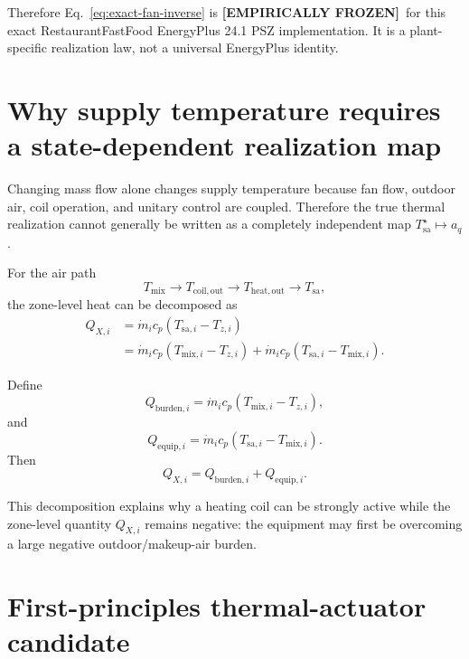 \documentclass[11pt]{article}
\newcommand{\mdot}{\dot m}
\newcommand{\Frozen}{\textbf{[EMPIRICALLY FROZEN]}}
\begin{document}
Therefore Eq.~\eqref{eq:exact-fan-inverse} is \Frozen\ for this exact
RestaurantFastFood EnergyPlus 24.1 PSZ implementation.  It is a
plant-specific realization law, not a universal EnergyPlus identity.

\section{Why supply temperature requires a state-dependent realization map}

Changing mass flow alone changes supply temperature because fan flow, outdoor
air, coil operation, and unitary control are coupled.  Therefore the true
thermal realization cannot generally be written as a completely independent
map $T_{\mathrm{sa}}^\star\mapsto a_q$.

For the air path
\begin{equation}
T_{\mathrm{mix}}
\longrightarrow
T_{\mathrm{coil,out}}
\longrightarrow
T_{\mathrm{heat,out}}
\longrightarrow
T_{\mathrm{sa}},
\end{equation}
the zone-level heat can be decomposed as
\begin{align}
Q_{X,i}
&=
\mdot_i c_p
\left(
T_{\mathrm{sa},i}-T_{z,i}
\right)
\nonumber\\
&=
\mdot_i c_p
\left(
T_{\mathrm{mix},i}-T_{z,i}
\right)
+
\mdot_i c_p
\left(
T_{\mathrm{sa},i}-T_{\mathrm{mix},i}
\right).
\label{eq:airpath-decomposition}
\end{align}

Define
\begin{equation}
Q_{\mathrm{burden},i}
=
\mdot_i c_p
\left(
T_{\mathrm{mix},i}-T_{z,i}
\right),
\label{eq:airpath-burden}
\end{equation}
and
\begin{equation}
Q_{\mathrm{equip},i}
=
\mdot_i c_p
\left(
T_{\mathrm{sa},i}-T_{\mathrm{mix},i}
\right).
\label{eq:airpath-equipment}
\end{equation}
Then
\begin{equation}
Q_{X,i}
=
Q_{\mathrm{burden},i}
+
Q_{\mathrm{equip},i}.
\label{eq:airpath-sum}
\end{equation}

This decomposition explains why a heating coil can be strongly active while
the zone-level quantity $Q_{X,i}$ remains negative: the equipment may first be
overcoming a large negative outdoor/makeup-air burden.

\section{First-principles thermal-actuator candidate}
\end{document}
